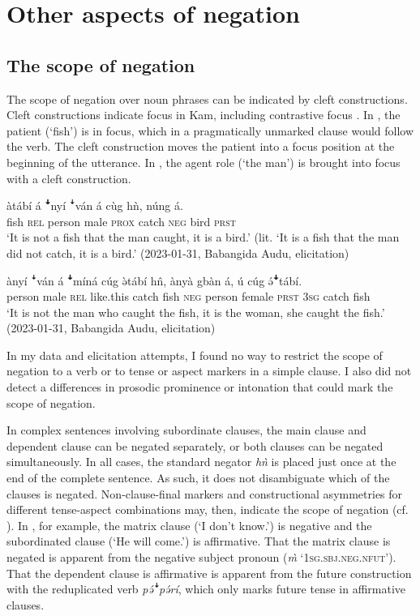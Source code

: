 \documentclass[output=paper,colorlinks,citecolor=brown]{langscibook}
\begin{document}
\section{Other aspects of negation}\label{sec:kam:4}
\subsection{The scope of negation}\label{sec:kam:4.1}

The scope of negation over noun phrases can be indicated by cleft constructions. Cleft constructions indicate focus in Kam, including contrastive focus \citep[375--378]{Lesage2020}. In , the patient (‘fish’) is in focus, which in a pragmatically unmarked clause would follow the verb. The cleft construction moves the patient into a focus position at the beginning of the utterance. In , the agent role (‘the man’) is brought into focus with a cleft construction. 

\ea\label{ex:kam:76} 
    \gll àtábí á \textbf{ꜜ}nyí ꜜván á cùg hǹ, núng á.\\
        fish \textsc{rel} person male \textsc{prox} catch \textsc{neg} bird \textsc{prst}\\
    \glt ‘It is not a fish that the man caught, it is a bird.’ (lit. ‘It is a fish that the man did not catch, it is a bird.’ (2023-01-31, Babangida Audu, elicitation)
\z 

\ea\label{ex:kam:77} 
    \gll ànyí ꜜván á \textbf{ꜜ}míná cúg ə̀tábí h\^{n}, ànyà gbàn á, ú cúg ə́\textbf{ꜜ}tábí.\\
        person male \textsc{rel} like.this catch fish \textsc{neg} person female \textsc{prst} \textsc{3sg} catch fish\\
    \glt ‘It is not the man who caught the fish, it is the woman, she caught the fish.’ (2023-01-31, Babangida Audu, elicitation)
\z 

In my data and elicitation attempts, I found no way to restrict the scope of negation to a verb or to tense or aspect markers in a simple clause. I also did not detect a differences in prosodic prominence or intonation that could mark the scope of negation.

In complex sentences involving subordinate clauses, the main clause and dependent clause can be negated separately, or both clauses can be negated simultaneously. In all cases, the standard negator \textit{hǹ} is placed just once at the end of the complete sentence. As such, it does not disambiguate which of the clauses is negated. Non-clause-final markers and constructional asymmetries for different tense-aspect combinations may, then, indicate the scope of negation (cf. ). In , for example, the matrix clause (‘I don’t know.’) is negative and the subordinated clause (‘He will come.’) is affirmative. That the matrix clause is negated is apparent from the negative subject pronoun (\textit{\`{m}} ‘1\textsc{sg}.\textsc{sbj}.\textsc{neg}.\textsc{nfut}’). That the dependent clause is affirmative is apparent from the future construction with the reduplicated verb \textit{pə́ꜜpə́rí}, which only marks future tense in affirmative clauses.
\end{document}
